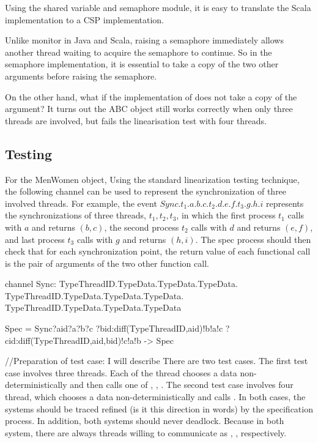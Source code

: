 \documentclass{article}
\begin{document}
Using the shared variable and semaphore module, it is easy to translate the Scala implementation to a CSP implementation.

Unlike monitor in Java and Scala, raising a semaphore immediately allows another thread waiting to acquire the semaphore to continue. So in the semaphore implementation, it is essential to take a copy of the two other arguments before raising the semaphore.

On the other hand, what if the implementation of  does not take a copy of the argument? It turns out the ABC object still works correctly when only three threads are involved, but fails the linearisation test with four threads.

\subsection{Testing}
For the MenWomen object, 
Using the standard linearization testing technique, the following  channel can be used to represent the synchronization of three involved threads. For example, the event $Sync.t_1.a.b.c.t_2.d.e.f.t_3.g.h.i$ represents the synchronizations of three threads, $t_1,t_2,t_3$, in which the first process $t_1$ calls  with $a$ and returns $(b,c)$, the second process $t_2$ calls  with $d$ and returns $(e,f)$, and last process $t_3$ calls  with $g$ and returns $(h,i)$. The spec process should then check that for each synchronization point, the return value of each functional call is the pair of arguments of the two other function call.

\begin{cspinline}{}{}
channel Sync: TypeThreadID.TypeData.TypeData.TypeData.
              TypeThreadID.TypeData.TypeData.TypeData.
              TypeThreadID.TypeData.TypeData.TypeData

Spec = Sync?aid?a?b?c
           ?bid:diff(TypeThreadID,{aid})!b!a!c
           ?cid:diff(TypeThreadID,{aid,bid})!c!a!b 
    -> Spec
\end{cspinline}
//Preparation of test case: I will describe 
There are two test cases. The first test case involves three threads. Each of the thread chooses a data non-deterministically and then calls one of , , . The second test case involves four thread, which chooses a data non-deterministically and calls . In both cases, the systems should be traced refined (is it this direction in words) by the specification process. In addition, both systems should never deadlock. Because in both system, there are always threads willing to communicate as , ,  respectively.
\end{document}
